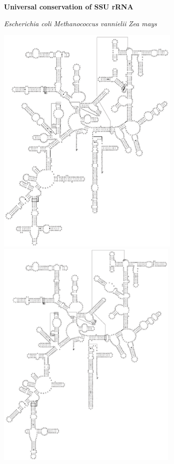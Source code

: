 \documentclass[landscape]{slides}
\begin{document}
\begin{slide}
\begin{center}

\textbf{Universal conservation of SSU rRNA}
\end{center}
\vspace{0.5in}
\small
\hspace{0.75in}
\emph{Escherichia coli}
\hspace{1.2in}
\emph{Methanococcus vannielii}
\hspace{1.2in}
\emph{Zea mays}

\begin{center}
\includegraphics[height=4.45in]{figs/ecoli_16S_man}
\includegraphics[height=4.45in]{figs/mvan_16S_man}

\end{center}
\end{slide}
\end{document}
